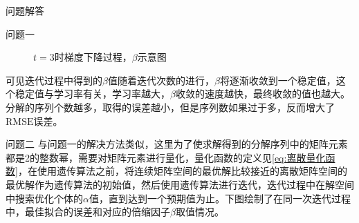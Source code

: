 \documentclass[11pt]{article}
\begin{document}
\begin{section}{问题解答}
\begin{subsection}{问题一}
   \begin{figure}[H]
     \centering
     \label{fig:$t=3$时梯度下降过程，beta示意图}
     \caption{$t=3$时梯度下降过程，$\beta$示意图}
   \end{figure}
   可见迭代过程中得到的$\beta$值随着迭代次数的进行，$\beta$将逐渐收敛到一个稳定值，这个稳定值与学习率有关，学习率越大，$\beta$收敛的速度越快，最终收敛的值也越大。分解的序列个数越多，取得的误差越小，但是序列数如果过于多，反而增大了$\mathrm{RMSE}$误差。\par
 \end{subsection}
 \begin{subsection}{问题二}
   与问题一的解决方法类似，这里为了使求解得到的分解序列中的矩阵元素都是2的整数幂，需要对矩阵元素进行量化，量化函数的定义见\ref{eq:离散量化函数}，在使用遗传算法之前，将连续矩阵空间的最优解比较接近的离散矩阵空间的最优解作为遗传算法的初始值，然后使用遗传算法进行迭代，迭代过程中在解空间中搜索优化个体的$\alpha$值，直到达到一个预期值为止。下图绘制了在同一次迭代过程中，最佳拟合的误差和对应的倍缩因子$\beta$取值情况。
   \begin{figure}[H]
     \graphicspath{{./fig/problem_2}}
     \centering

\end{figure}
\end{subsection}
\end{section}
\end{document}
